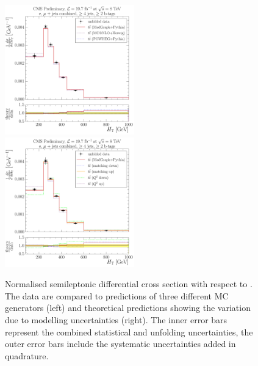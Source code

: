 \begin{figure}[!htbp]
	\centering
  	{\includegraphics[width=0.5\textwidth]{measurement/HT/central/normalised_xsection_combined_different_generators}}\hfill
  	{\includegraphics[width=0.5\textwidth]{measurement/HT/central/normalised_xsection_combined_systematics_shifts}}
    \caption[Normalised semileptonic \ttbar differential cross section with respect to \HT]{Normalised semileptonic
      \ttbar differential cross section with respect to \HT. The data are compared to predictions of three different MC
      generators (left) and theoretical predictions showing the variation due to modelling uncertainties (right). The
      inner error bars represent the combined statistical and unfolding uncertainties, the outer error bars include the
      systematic uncertainties added in quadrature.}
    \label{fig:results_HT_combined}
\end{figure}

